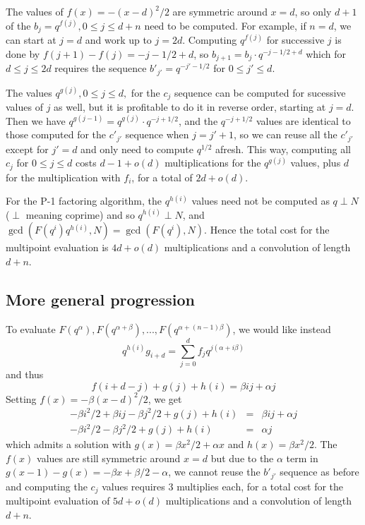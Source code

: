 \documentclass{article}
\begin{document}
The values of $f(x)=-(x-d)^2/2$ are symmetric around $x=d$, so only $d+1$ of 
the $b_j = q^{f(j)}, 0 \leq j \leq d+n$ need to be computed. For example, if
$n = d$, we
can start at $j=d$ and work up to $j=2d$. Computing $q^{f(j)}$ for 
successive $j$ is done by $f(j+1) - f(j) = -j -1/2 + d$,
so $b_{j + 1} = b_j \cdot q^{-j -1/2 + d}$ which for $d \leq j \leq 2d$
requires the sequence $b'_{j'} = q^{-j' -1/2}$ for $0 \leq j' \leq d$.

The values $q^{g(j)}, 0 \leq j \leq d,$ for the $c_j$ sequence can be computed 
for sucessive values of $j$ as well, but it is profitable to do it in reverse 
order, starting at $j = d$. Then we have 
$q^{g(j - 1)} = q^{g(j)} \cdot q^{-j + 1/2}$, and the $q^{-j + 1/2}$ values 
are identical to those computed for the $c'_{j'}$ sequence when $j = j' + 1$,
so we can reuse all the $c'_{j'}$ except for $j' = d$ and only need to compute
$q^{1/2}$ afresh. This way, computing all $c_j$ for $0 \leq j \leq d$
costs $d - 1 + o(d)$ multiplications for the $q^{g(j)}$ values, plus $d$ for 
the multiplication with $f_i$, for a total of $2d + o(d)$.

For the P-1 factoring algorithm, the $q^{h(i)}$ values need not be computed 
as $q \perp N$ ($\perp$ meaning coprime) and so 
$q^{h(i)} \perp N$, and $\gcd(F(q^i) q^{h(i)}, N) = \gcd(F(q^i), N)$.
Hence the total cost for the multipoint evaluation is $4d + o(d)$ 
multiplications and a convolution of length $d+n$.

\subsection{More general progression}
To evaluate $F(q^{\alpha}), F(q^{\alpha+\beta}), ..., 
F(q^{\alpha+(n-1)\beta})$, we would like instead
\begin{displaymath}
q^{h(i)} g_{i+d} = \sum_{j=0}^{d} f_j q^{j(\alpha+i\beta)}
\end{displaymath}
and thus
\begin{displaymath}
  f(i+d-j) + g(j) + h(i) = \beta ij + \alpha j
\end{displaymath}
Setting $f(x)=-\beta (x-d)^2/2$, we get
\begin{eqnarray*}
-\beta i^2/2 + \beta ij - \beta j^2/2 + g(j) + h(i) & = & \beta ij + \alpha j\\
-\beta i^2/2 - \beta j^2/2 + g(j) + h(i)& = & \alpha j
\end{eqnarray*}
%
which admits a solution with $g(x) = \beta x^2/2 + \alpha x$ and 
$h(x) = \beta x^2/2$. The $f(x)$ values are still symmetric around $x=d$ but
due to the $\alpha$ term in $g(x - 1) - g(x) = -\beta x + \beta/2 - \alpha$,
we cannot reuse the $b'_{j'}$ sequence as before and computing the $c_j$ values
requires $3$ multiplies each, for a total cost for the multipoint evaluation
of $5d + o(d)$ multiplications and a convolution of length $d+n$.
\end{document}
